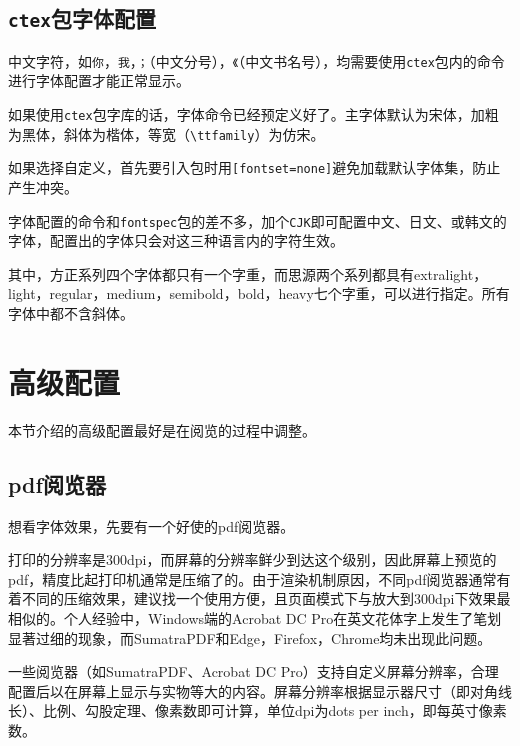 \documentclass[10pt,openany]{book}
\begin{document}
\begin{sloppypar}
    \subsection{\texttt{ctex}包字体配置}

    中文字符，如\texttt{你}，\texttt{我}，\texttt{；}（中文分号），\texttt{《}（中文书名号），均需要使用\texttt{ctex}包内的命令进行字体配置才能正常显示。

    如果使用\texttt{ctex}包字库的话，字体命令已经预定义好了。主字体默认为宋体，加粗为黑体，斜体为楷体，等宽（\texttt{\textbackslash{}ttfamily}）为仿宋。

    

    如果选择自定义，首先要引入包时用\texttt{{[}fontset=none{]}}避免加载默认字体集，防止产生冲突。

    

    字体配置的命令和\texttt{fontspec}包的差不多，加个\texttt{CJK}即可配置中文、日文、或韩文的字体，配置出的字体只会对这三种语言内的字符生效。

    

    其中，方正系列四个字体都只有一个字重，而思源两个系列都具有extralight，light，regular，medium，semibold，bold，heavy七个字重，可以进行指定。所有字体中都不含斜体。

    \section{高级配置}

    本节介绍的高级配置最好是在阅览的过程中调整。

    \subsection{pdf阅览器}

    想看字体效果，先要有一个好使的pdf阅览器。

    打印的分辨率是300dpi，而屏幕的分辨率鲜少到达这个级别，因此屏幕上预览的pdf，精度比起打印机通常是压缩了的。由于渲染机制原因，不同pdf阅览器通常有着不同的压缩效果，建议找一个使用方便，且页面模式下与放大到300dpi下效果最相似的。个人经验中，Windows端的Acrobat DC Pro在英文花体字上发生了笔划显著过细的现象，而SumatraPDF和Edge，Firefox，Chrome均未出现此问题。

    一些阅览器（如SumatraPDF、Acrobat DC Pro）支持自定义屏幕分辨率，合理配置后以在屏幕上显示与实物等大的内容。屏幕分辨率根据显示器尺寸（即对角线长）、比例、勾股定理、像素数即可计算，单位dpi为dots per inch，即每英寸像素数。


\end{sloppypar}
\end{document}
